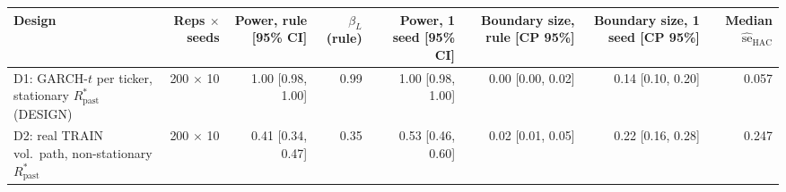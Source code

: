 \begin{tabular}{lrrrrrrr}
\toprule
Design & Reps $\times$ seeds & Power, rule [95\% CI] & $\beta_L$ (rule) & Power, 1 seed [95\% CI] & Boundary size, rule [CP 95\%] & Boundary size, 1 seed [CP 95\%] & Median $\widehat{\mathrm{se}}_{\mathrm{HAC}}$ \\
\midrule
D1: GARCH-$t$ per ticker, stationary $R_{\mathrm{past}}^*$ (DESIGN) & 200 $\times$ 10 & 1.00 [0.98, 1.00] & 0.99 & 1.00 [0.98, 1.00] & 0.00 [0.00, 0.02] & 0.14 [0.10, 0.20] & 0.057 \\
D2: real TRAIN vol.\ path, non-stationary $R_{\mathrm{past}}^*$ & 200 $\times$ 10 & 0.41 [0.34, 0.47] & 0.35 & 0.53 [0.46, 0.60] & 0.02 [0.01, 0.05] & 0.22 [0.16, 0.28] & 0.247 \\
\bottomrule
\end{tabular}
